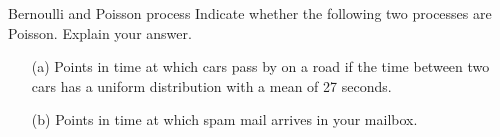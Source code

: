 \begin{problem}{Bernoulli and Poisson process}
Indicate whether the following two processes are Poisson. Explain your answer.
\begin{itemize}
\item[(a)] Points in time at which cars pass by on a road if the time between two cars has a uniform distribution with a mean of 27 seconds.
\item[(b)] Points in time at which spam mail arrives in your mailbox.
\end{itemize}
\end{problem}
